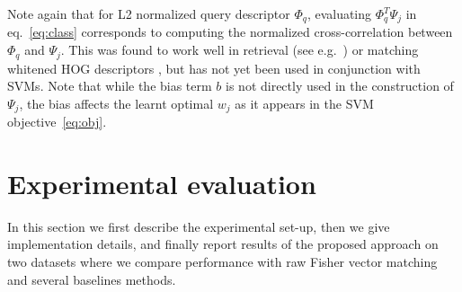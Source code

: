 \documentclass[10pt,twocolumn,letterpaper]{article}
\begin{document}
      \textcolor{petr}{%
         Note again that for L2 normalized query descriptor $\Phi_q$, evaluating $\Phi_q^T\Psi_j$ in eq.~\eqref{eq:class} corresponds to computing the normalized cross-correlation between $\Phi_q$ and $\Psi_j$. This was found to work well in retrieval (see e.g.~\cite{Sivic03}) or matching whitened HOG descriptors \cite{Gharbi12, Hariharan12}, but has not yet been used in conjunction with SVMs.    
         Note that while the bias term $b$ is not directly used in the construction of $\Psi_j$, the bias affects the learnt optimal $w_j$ as it appears in the SVM objective~\eqref{eq:obj}. 
      }



\section{Experimental evaluation}
\label{sec:exp}
   In this section we first describe the experimental set-up, then we give implementation details, and finally report results of the proposed approach on two datasets where we compare performance with raw Fisher vector matching and several baselines methods. 
\end{document}
